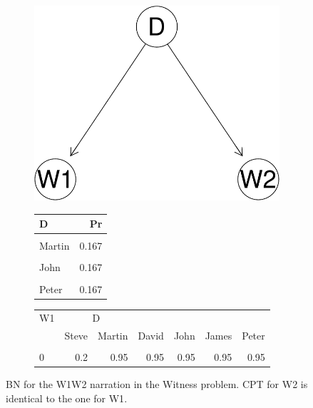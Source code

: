 \documentclass[
  10pt,
]{scrartcl}
\begin{document}
\begin{figure}[H]
{\begin{subfigure}[!ht]{0.4\textwidth}
\begin{center}\includegraphics[width=1\linewidth]{coherencePaper32_files/figure-latex/unnamed-chunk-28-1} \end{center}
\end{subfigure}} \hfill
\begin{subfigure}[!ht]{0.3\textwidth}
\begin{tabular}{lr}
\toprule
D & Pr\\
\midrule
\cellcolor{gray!6}{Steve} & \cellcolor{gray!6}{0.167}\\
Martin & 0.167\\
\cellcolor{gray!6}{David} & \cellcolor{gray!6}{0.167}\\
John & 0.167\\
\cellcolor{gray!6}{James} & \cellcolor{gray!6}{0.167}\\
Peter & 0.167\\
\bottomrule
\end{tabular}
\end{subfigure}
\centering
\begin{subfigure}[!ht]{0.3\textwidth}
\begin{tabular}{lrrrrrr}
\toprule
\multicolumn{1}{c}{W1} & \multicolumn{2}{c}{D} \\
  & Steve & Martin & David & John & James & Peter\\
\midrule
\cellcolor{gray!6}{1} & \cellcolor{gray!6}{0.8} & \cellcolor{gray!6}{0.05} & \cellcolor{gray!6}{0.05} & \cellcolor{gray!6}{0.05} & \cellcolor{gray!6}{0.05} & \cellcolor{gray!6}{0.05}\\
0 & 0.2 & 0.95 & 0.95 & 0.95 & 0.95 & 0.95\\
\bottomrule
\end{tabular}
\end{subfigure}
\caption{BN for the \textsf{W1W2} narration in the \textsf{Witness} problem. CPT for \textsf{W2} is identical to the one for \textsf{W1}.}
\label{fig:w1w2}
\end{figure}
\end{document}
